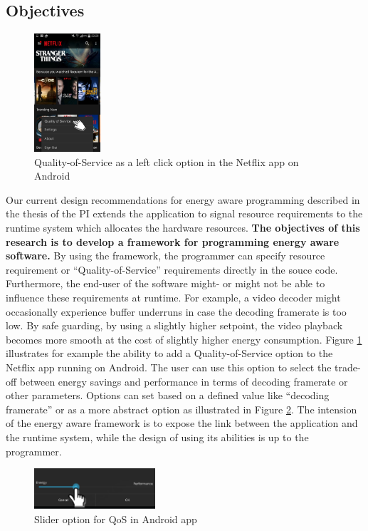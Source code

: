 \documentclass{article}
\begin{document}
\subsection{Objectives}
\begin{figure}
  \begin{center}
    \includegraphics[width=0.22\textwidth]{fig/netflix.png}
  \end{center}
  \caption{Quality-of-Service as a left click option in the Netflix app on Android}
  \label{fig:netflix}
  \vspace{0.5cm}
\end{figure}
Our current design recommendations for energy aware programming described in the thesis of the PI extends the application to signal resource requirements to the runtime system which allocates the hardware resources.
\textbf{The objectives of this research is to develop a framework for programming energy aware software.}
By using the framework, the programmer can specify resource requirement or ``Quality-of-Service'' requirements directly in the souce code.
Furthermore, the end-user of the software might- or might not be able to influence these requirements at runtime.
For example, a video decoder might occasionally experience buffer underruns in case the decoding framerate is too low.
By safe guarding, by using a slightly higher setpoint, the video playback becomes more smooth at the cost of slightly higher energy consumption.
Figure \ref{fig:netflix} illustrates for example the ability to add a Quality-of-Service option to the Netflix app running on Android.
The user can use this option to select the trade-off between energy savings and performance in terms of decoding framerate or other parameters. 
Options can set based on a defined value like ``decoding framerate'' or as a more abstract option as illustrated in Figure \ref{fig:slider}. 
The intension of the energy aware framework is to expose the link between the application and the runtime system, while the design of using its abilities is up to the programmer.
\begin{figure}
  \begin{center}
    \includegraphics[width=0.4\textwidth]{fig/slider.png}
  \end{center}
  \caption{Slider option for QoS in Android app}
  \label{fig:slider}
\end{figure}
\end{document}
